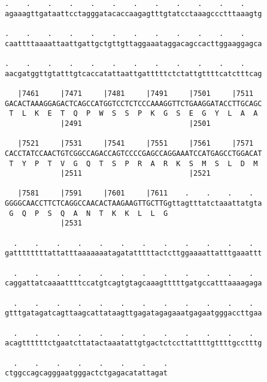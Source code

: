 \documentclass{article}
\begin{document}
\begin{Verbatim}
.    .    .    .    .    .    .    .    .    .    .    .    
agaaagttgataattcctagggatacaccaagagtttgtatcctaaagccctttaaagtg
                                                            
.    .    .    .    .    .    .    .    .    .    .    .    
caattttaaaattaattgattgctgttgttaggaaataggacagccacttggaaggagca
                                                            
.    .    .    .    .    .    .    .    .    .    .    .    
aacgatggttgtatttgtcaccatattaattgatttttctctattgttttcatctttcag
                                                            
   |7461     |7471     |7481     |7491     |7501     |7511  
GACACTAAAGGAGACTCAGCCATGGTCCTCTCCCAAAGGTTCTGAAGGATACCTTGCAGC
 T  L  K  E  T  Q  P  W  S  S  P  K  G  S  E  G  Y  L  A  A 
             |2491                         |2501            
  
   |7521     |7531     |7541     |7551     |7561     |7571  
CACCTATCCAACTGTCGGCCAGACCAGTCCCCGAGCCAGGAAATCCATGAGCCTGGACAT
 T  Y  P  T  V  G  Q  T  S  P  R  A  R  K  S  M  S  L  D  M 
             |2511                         |2521            
  
   |7581     |7591     |7601     |7611    .    .    .    .  
GGGGCAACCTTCTCAGGCCAACACTAAGAAGTTGCTTGgttagtttatctaaattatgta
 G  Q  P  S  Q  A  N  T  K  K  L  L  G                      
             |2531                                          
  
  .    .    .    .    .    .    .    .    .    .    .    .  
gattttttttattatttaaaaaaatagatatttttactcttggaaaattatttgaaattt
                                                            
  .    .    .    .    .    .    .    .    .    .    .    .  
caggattatcaaaattttccatgtcagtgtagcaaagtttttgatgccatttaaaagaga
                                                            
  .    .    .    .    .    .    .    .    .    .    .    .  
gtttgatagatcagttaagcattataagttgagatagagaaatgagaatgggaccttgaa
                                                            
  .    .    .    .    .    .    .    .    .    .    .    .  
acagttttttctgaatcttatactaaatattgtgactctccttattttgttttgcctttg
                                                            
  .    .    .    .    .    .    .    .
ctggccagcagggaatgggactctgagacatattagat
                                      
                                      
 

\end{Verbatim}
\end{document}
